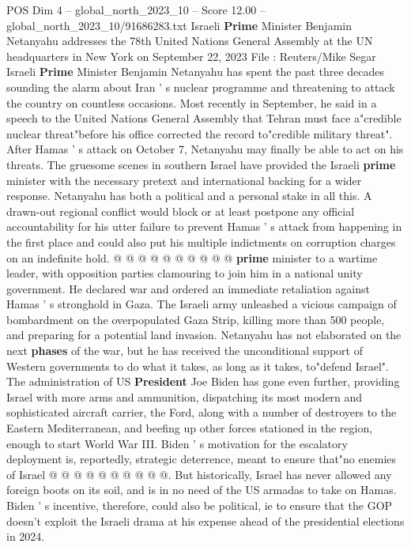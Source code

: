 \begin{textsample}{POS Dim 4 – global\_north\_2023\_10 – Score 12.00 – global\_north\_2023\_10/91686283.txt}  \label{ex:f4_pos_450}
Israeli \textbf{Prime} Minister Benjamin Netanyahu addresses the 78th United Nations General Assembly at the UN headquarters in New York on September 22, 2023 File : Reuters/Mike Segar Israeli \textbf{Prime} Minister Benjamin Netanyahu has spent the past three decades sounding the alarm about Iran ' s nuclear programme and threatening to attack the country on countless occasions.
Most recently in September, he said in a speech to the United Nations General Assembly that Tehran must face a"credible nuclear threat"before his office corrected the record to"credible military threat".
After Hamas ' s attack on October 7, Netanyahu may finally be able to act on his threats.
The gruesome scenes in southern Israel have provided the Israeli \textbf{prime} minister with the necessary pretext and international backing for a wider response.
Netanyahu has both a political and a personal stake in all this.
A drawn-out regional conflict would block or at least postpone any official accountability for his utter failure to prevent Hamas ' s attack from happening in the first place and could also put his multiple indictments on corruption charges on an indefinite hold. @ @ @ @ @ @ @ @ @ @ \textbf{prime} minister to a wartime leader, with opposition parties clamouring to join him in a national unity government.
He declared war and ordered an immediate retaliation against Hamas ' s stronghold in Gaza.
The Israeli army unleashed a vicious campaign of bombardment on the overpopulated Gaza Strip, killing more than 500 people, and preparing for a potential land invasion.
Netanyahu has not elaborated on the next \textbf{phases} of the war, but he has received the unconditional support of Western governments to do what it takes, as long as it takes, to"defend Israel".
The administration of US \textbf{President} Joe Biden has gone even further, providing Israel with more arms and ammunition, dispatching its most modern and sophisticated aircraft carrier, the Ford, along with a number of destroyers to the Eastern Mediterranean, and beefing up other forces stationed in the region, enough to start World War III.
Biden ' s motivation for the escalatory deployment is, reportedly, strategic deterrence, meant to ensure that"no enemies of Israel @ @ @ @ @ @ @ @ @ @.
But historically, Israel has never allowed any foreign boots on its soil, and is in no need of the US armadas to take on Hamas.
Biden ' s incentive, therefore, could also be political, ie to ensure that the GOP doesn't exploit the Israeli drama at his expense ahead of the presidential elections in 2024.

\end{textsample}
